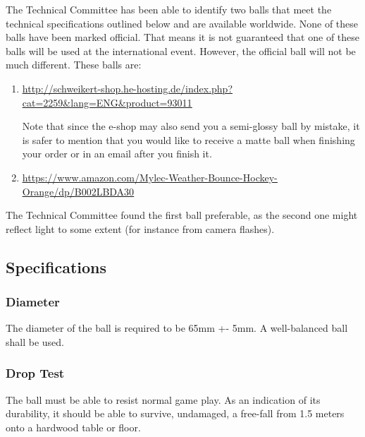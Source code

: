 \documentclass{article}
\begin{document}
The Technical Committee has been able to identify two balls that meet the
technical specifications outlined below and are available worldwide. None of
these balls have been marked official. That means it is not guaranteed that one
of these balls will be used at the international event. However, the official
ball will not be much different. These balls are:

\begin{enumerate}

\item \underline{\href{http://schweikert-shop.he-hosting.de/index.php?cat=2259&lang=ENG&product=93011}{http://schweikert-shop.he-hosting.de/index.php?cat=2259\&lang=ENG\&product=93011}}

    Note that since the e-shop may also send you a semi-glossy ball
        by mistake, it is safer to mention that you would like to receive a
        matte ball when finishing your order or in an email after you finish it.

\item \underline{\href{https://www.amazon.com/Mylec-Weather-Bounce-Hockey-Orange/dp/B002LBDA30}{https://www.amazon.com/Mylec-Weather-Bounce-Hockey-Orange/dp/B002LBDA30}}

\end{enumerate}

The Technical Committee found the first ball preferable, as the second one
might reflect light to some extent (for instance from camera flashes).

\subsection{Specifications}

\subsubsection{Diameter}

The diameter of the ball is required to be 65mm +- 5mm. A well-balanced ball
shall be used.

\subsubsection{Drop Test}

The ball must be able to resist normal game play. As an indication of its
durability, it should be able to survive, undamaged, a free-fall from 1.5
meters onto a hardwood table or floor.
\end{document}
